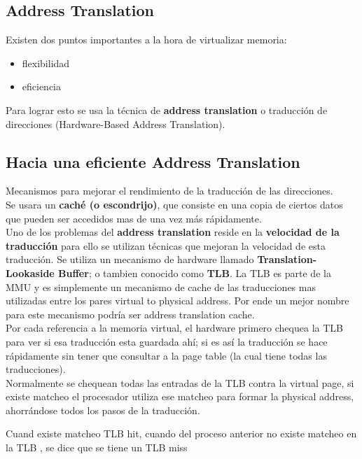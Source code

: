 \documentclass[../main.tex]{subfiles}
\begin{document}
    \subsection{Address Translation}
        Existen dos puntos importantes a la hora de virtualizar memoria:
        \begin{itemize}
            \item flexibilidad
            \item eficiencia
        \end{itemize}

        Para lograr esto se usa la técnica de \textbf{address translation} o traducción de direcciones (Hardware-Based Address Translation).
    
    \subsection{Hacia una eficiente Address Translation}
        Mecanismos para mejorar el rendimiento de la traducción de las direcciones.\\

        Se usara un \textbf{caché (o escondrijo)}, que consiste en una copia de ciertos datos que pueden ser accedidos mas de una vez más rápidamente.\\

        Uno de los problemas del \textbf{address translation} reside en la \textbf{velocidad de la traducción} para ello se utilizan técnicas que mejoran la velocidad de esta traducción. Se utiliza un mecanismo de hardware llamado \textbf{Translation-Lookaside Buffer}; o tambien conocido como \textbf{TLB}. La TLB es parte de la MMU y es simplemente un mecanismo de cache de las traducciones mas utilizadas entre los pares virtual to physical address. Por ende un mejor nombre para este mecanismo podría ser address translation cache.\\

        Por cada referencia a la memoria virtual, el hardware primero chequea la TLB para ver si esa traducción esta guardada ahí; si es así la traducción se hace rápidamente sin tener que consultar a la page table (la cual tiene todas las traducciones).\\

        Normalmente se chequean todas las entradas de la TLB contra la virtual page, si existe matcheo el procesador utiliza ese matcheo para formar la physical address, ahorrándose todos los pasos de la traducción.

        Cuand existe matcheo TLB hit, cuando del proceso anterior no existe matcheo en la TLB , se dice que se tiene un TLB miss
\end{document}
